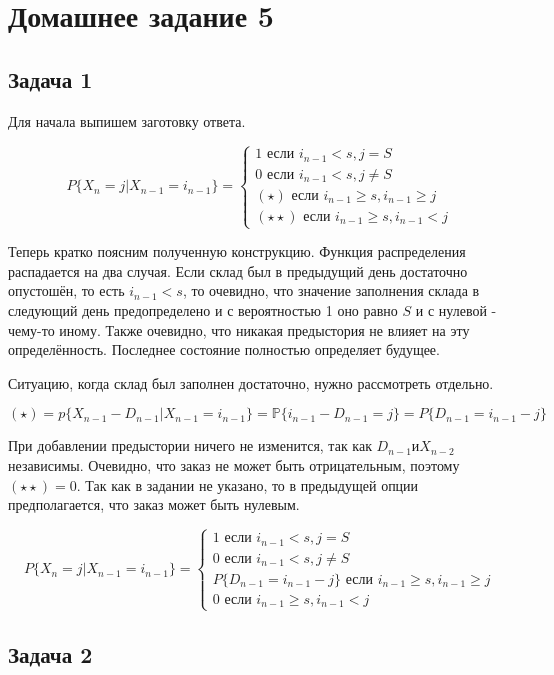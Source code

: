 \documentclass[a4paper,12pt]{article}
\def \mbb{\mathbb}
\def \P{\mbb{P}}
\begin{document}
\section{Домашнее задание 5}
\subsection{Задача 1}
Для начала выпишем заготовку ответа.

\[ P\{ X_n = j | X_{n-1} = i_{n-1} \} = 
\begin{cases}
1  \text{ если } i_{n-1} < s, j = S \\
0  \text{ если } i_{n-1} < s, j \neq S\\
(\star) \text{ если } i_{n-1} \ge s, i_{n-1} \ge j\\
(\star \star) \text{ если } i_{n-1} \ge s, i_{n-1} < j
\end{cases}\]

Теперь кратко поясним полученную конструкцию. Функция распределения распадается на два случая. Если склад был в предыдущий день достаточно опустошён, то есть  $ i_{n-1} < s $, то очевидно, что значение заполнения склада в следующий день предопределено и с вероятностью 1 оно равно $S$ и с нулевой - чему-то иному. Также очевидно, что никакая предыстория не влияет на эту определённость. Последнее состояние полностью определяет будущее.

Ситуацию, когда склад был заполнен достаточно, нужно рассмотреть отдельно.

\[ (\star) = p\{ X_{n-1} - D_{n-1} | X_{n-1} = i_{n-1} \} = \P\{ i_{n-1} - D_{n-1}  = j \} = P\{ D_{n-1} = i_{n-1} - j \} \] 

При добавлении предыстории ничего не изменится, так как $ D_{n-1} \text{и} X_{n-2} $ независимы.
Очевидно, что заказ не может быть отрицательным, поэтому $ (\star \star) = 0 $. Так как в задании не указано, то в предыдущей опции предполагается, что заказ может быть нулевым.


\[ P\{ X_n = j | X_{n-1} = i_{n-1} \} = 
\begin{cases}
1  \text{ если } i_{n-1} < s, j = S \\
0  \text{ если } i_{n-1} < s, j \neq S\\
P\{ D_{n-1} = i_{n-1} - j \} \text{ если } i_{n-1} \ge s, i_{n-1} \ge j\\
0 \text{ если } i_{n-1} \ge s, i_{n-1} < j
\end{cases}\]

\subsection{Задача 2}
\end{document}
